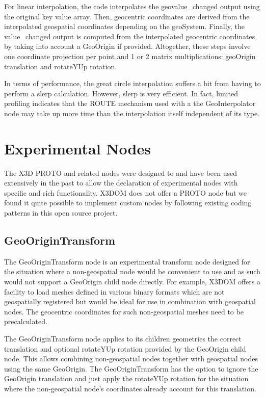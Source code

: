 \documentclass{acmsiggraph}                     %
\begin{document}
For linear interpolation, the code interpolates the geovalue\_changed output using the original key
value array. Then, geocentric coordinates are derived from the interpolated geospatial coordinates
depending on the geoSystem. Finally, the  value\_changed output is computed from the interpolated
geocentric coordinates by taking into account a GeoOrigin if provided. Altogether, these steps
involve one coordinate projection per point and 1 or 2 matrix multiplications: geoOrigin translation
and rotateYUp rotation.

In terms of performance, the great circle interpolation suffers a bit from having to perform a slerp
calculation. However, slerp is very efficient. In fact, limited profiling indicates that the ROUTE
mechanism used with a the GeoInterpolator node may take up more time than the interpolation itself
independent of its type.

\section{Experimental Nodes}

The X3D PROTO and related nodes were designed to and have been used extensively in the past to allow the declaration of experimental nodes with specific and rich functionality. X3DOM does not offer a PROTO node but we found it quite possible to implement custom nodes by following existing coding patterns in this open source project.

\subsection{GeoOriginTransform}

The GeoOriginTransform node is an experimental transform node designed for the situation where 
a non-geospatial node would be convenient to use and as such would not support a GeoOrigin child 
node directly. For example, X3DOM offers a facility to load meshes defined in various binary 
formats which are not geospatially registered but would be ideal for use in combination with 
geospatial nodes. The geocentric coordinates for such non-geospatial meshes need to be 
precalculated.

The GeoOriginTransform node applies to its children geometries the correct translation and 
optional rotateYUp rotation provided by the GeoOrigin child node. This allows combining 
non-geospatial nodes together with geospatial nodes using the same GeoOrigin. The GeoOriginTransform has 
the option to ignore the GeoOrigin translation and just apply the rotateYUp rotation for the 
situation where the non-geospatial node's coordinates already account for this translation.
\end{document}
